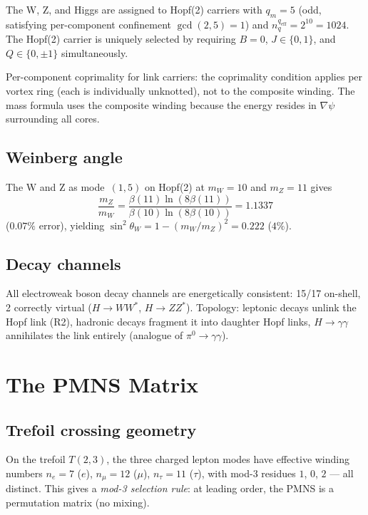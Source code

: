 \documentclass[11pt,a4paper]{article}
\begin{document}
The W, Z, and Higgs are assigned to Hopf(2) carriers with
$q_m = 5$ (odd, satisfying per-component confinement
$\gcd(2,5) = 1$) and $n_q^{q_{\text{eff}}} = 2^{10} = 1024$.
The Hopf(2) carrier is uniquely selected by requiring
$B = 0$, $J \in \{0,1\}$, and $Q \in \{0, \pm 1\}$
simultaneously.

Per-component coprimality for link carriers: the coprimality
condition applies per vortex ring (each is individually
unknotted), not to the composite winding.  The mass formula
uses the composite winding because the energy resides in
$\nabla\psi$ surrounding all cores.

\subsection{Weinberg angle}

The W and Z as mode~$(1,5)$ on Hopf(2) at $m_W = 10$ and
$m_Z = 11$ gives
\begin{equation}
  \frac{m_Z}{m_W}
    = \frac{\beta(11)\ln(8\beta(11))}
           {\beta(10)\ln(8\beta(10))}
    = 1.1337
  \label{eq:WZratio}
\end{equation}
($0.07\%$ error), yielding
$\sin^2\theta_W = 1-(m_W/m_Z)^2 = 0.222$ ($4\%$).

\subsection{Decay channels}

All electroweak boson decay channels are energetically consistent:
15/17 on-shell, 2 correctly virtual ($H \to WW^*$,
$H \to ZZ^*$).  Topology: leptonic decays unlink the Hopf link
(R2), hadronic decays fragment it into daughter Hopf links,
$H \to \gamma\gamma$ annihilates the link entirely (analogue of
$\pi^0 \to \gamma\gamma$).


\section{The PMNS Matrix}
\label{sec:pmns}

\subsection{Trefoil crossing geometry}

On the trefoil $T(2,3)$, the three charged lepton modes have
effective winding numbers $n_e = 7$ ($e$), $n_\mu = 12$ ($\mu$),
$n_\tau = 11$ ($\tau$), with mod-3 residues $1$, $0$, $2$ ---
all distinct.  This gives a \emph{mod-3 selection rule}: at
leading order, the PMNS is a permutation matrix (no mixing).
\end{document}
